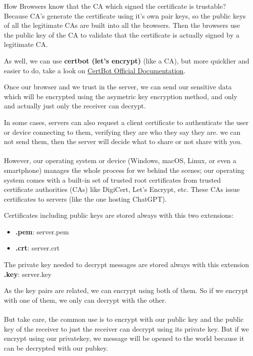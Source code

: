 \documentclass{article}
\newenvironment{blocktemplateI}[1]{%
    \tcolorbox[beamer,%
    noparskip,breakable,
    colframe=Violet,%
    colbacklower=Black,%
    title=#1]}%
    {\endtcolorbox}
\begin{document}
\begin{blocktemplateI}{Note}
How Browsers know that the CA which signed the certificate is trustable? Because CA's generate the certificate using it's own pair keys, so the public keys of all the legitimate CAs are built
into all the browsers. Then the browsers use the public key of the CA to validate that the certificate
is actually signed by a legitimate CA.
\end{blocktemplateI}

As well, we can use \textbf{certbot (let's encrypt)} (like a CA), but more quicklier and easier to do, take a look on \href{https://certbot.eff.org/}{CertBot Official Documentation}.

Once our browser and we trust in the server, we can send our sensitive data which will be encrypted using the asymetric key encryption method, and only and actually just only the receiver can decrypt.

\begin{blocktemplateI}{Note}
In some cases, servers can also request a client certificate to authenticate the user or device connecting to them, verifying they are who they say they are. we can not send them, then the server will decide what to share or not share with you.
\\\\
However, our operating system or device (Windows, macOS, Linux, or even a smartphone) manages the whole process for we behind the scenes; our operating system comes with a built-in set of trusted root certificates from trusted certificate authorities (CAs) like DigiCert, Let's Encrypt, etc. These CAs issue certificates to servers (like the one hosting ChatGPT).
\end{blocktemplateI}

Certificates including public keys are stored always with this two extensions: 
\begin{itemize}
    \item \textbf{.pem}: server.pem
    \item \textbf{.crt}: server.crt
\end{itemize}

The private key needed to decrypt messages are stored always with this extension \textbf{.key}: server.key

\begin{blocktemplateI}{Note}
As the key pairs are related, we can encrypt using both of them. So if we encrypt with one of them, we only can decrypt with the other.
\\\\
But take care, the common use is to encrypt with our public key and the public key of the receiver to just the receiver can decrypt using its private key. But if we encrypt using our privatekey, we message will be opened to the world because it can be decrypted with our pubkey.
\end{blocktemplateI}
\end{document}
